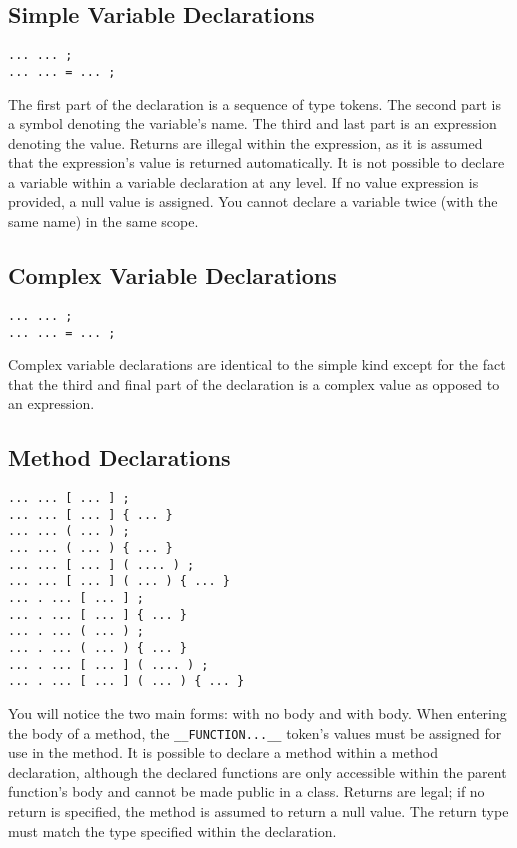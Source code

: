 \documentclass[10pt,a4paper]{article}
\begin{document}
\subsection{Simple Variable Declarations}
\label{sec:simpleVariableDeclarations}
\begin{verbatim}
... ... ;
... ... = ... ;
\end{verbatim}

The first part of the declaration is a sequence of type tokens. The second part is a symbol denoting the variable's name. The third and last part is an expression denoting the value. Returns are illegal within the expression, as it is assumed that the expression's value is returned automatically. It is not possible to declare a variable within a variable declaration at any level. If no value expression is provided, a null value is assigned. You cannot declare a variable twice (with the same name) in the same scope.

\subsection{Complex Variable Declarations}
\label{sec:complexVariableDeclarations}
\begin{verbatim}
... ... ;
... ... = ... ;
\end{verbatim}

Complex variable declarations are identical to the simple kind except for the fact that the third and final part of the declaration is a complex value as opposed to an expression.

\subsection{Method Declarations}
\label{sec:methodDeclarations}
\begin{verbatim}
... ... [ ... ] ;
... ... [ ... ] { ... }
... ... ( ... ) ;
... ... ( ... ) { ... }
... ... [ ... ] ( .... ) ;
... ... [ ... ] ( ... ) { ... }
... . ... [ ... ] ;
... . ... [ ... ] { ... }
... . ... ( ... ) ;
... . ... ( ... ) { ... }
... . ... [ ... ] ( .... ) ;
... . ... [ ... ] ( ... ) { ... }
\end{verbatim}

You will notice the two main forms: with no body and with body. When entering the body of a method, the \verb|__FUNCTION...__| token's values must be assigned for use in the method. It is possible to declare a method within a method declaration, although the declared functions are only accessible within the parent function's body and cannot be made public in a class. Returns are legal; if no return is specified, the method is assumed to return a null value. The return type must match the type specified within the declaration.
\end{document}
